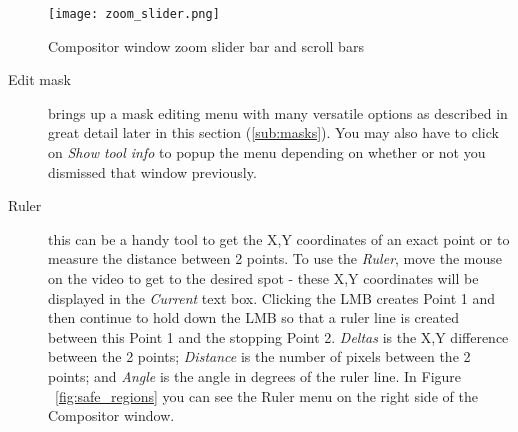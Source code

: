 \begin{figure}[htpb]
    \centering
    \texttt{[image: zoom\_slider.png]}
    \caption{Compositor window zoom slider bar and scroll bars}
    \label{fig:zoom_slider}
\end{figure}
\begin{description}
    \item[Edit mask] brings up a mask editing menu with many versatile options as
described in great detail later in this section (\ref{sub:masks}). You may also have to click on
\textit{Show tool info} to popup the menu depending on whether or not you dismissed that window previously.
    \item[Ruler] this can be a handy tool to get the X,Y coordinates of an exact point or to 
measure the distance between 2 points. To use the \textit{Ruler}, move the mouse on the video to
get to the desired spot - these X,Y coordinates will be displayed in the \textit{Current} text
box.  Clicking the LMB creates Point 1 and then continue to hold down the LMB so that a ruler line is created between
this Point 1 and the stopping Point 2.  \textit{Deltas} is the X,Y difference between the 2 points;
\textit{Distance} is the number of pixels between the 2 points; and \textit{Angle} is the angle in degrees of the ruler line.  
In Figure ~\ref{fig:safe_regions} you can see the Ruler menu on the right side of the Compositor window.


\end{description}
